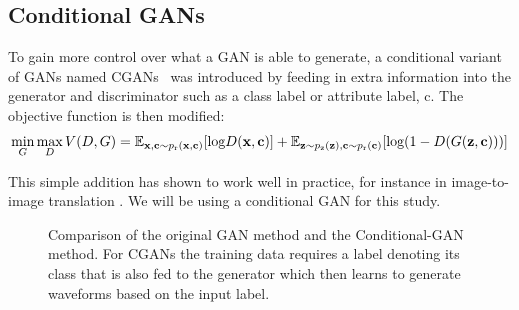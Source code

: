 \documentclass[12pt]{iopart}
\newcommand{\jordan}[1]{\textbf{\textcolor{red}{JORDAN: #1}}}
\newcommand{\chris}[1]{\textbf{\textcolor{green}{CHRIS: #1}}}
\begin{document}
\subsection{Conditional GANs}

%
To gain more control over what a GAN is able to generate, a conditional variant of \acp{GAN} named \acp{CGAN}~\cite{cgan} was introduced by feeding in extra information into the generator and discriminator such as a class label or attribute label, c. The objective function is then modified:
\begin{equation}
\mathop{\text{min}}_{G}  \mathop{\text{max}}_{D} V(D,G) = \mathbb{E}_{\mathbf{x,c} \sim p_{\text{r}}(\mathbf{x,c})} [\text{log} D(\mathbf{x,c})] \\ + \mathbb{E}_{\mathbf{z} \sim p_{\text{z}}(\mathbf{z}),\mathbf{c} \sim p_{\text{r}}(\mathbf{c})} [\text{log}(1-D(G(\mathbf{z,c})))]
\label{equation:cGANloss}
\end{equation}

This simple addition has shown to work well in practice, for instance in image-to-image translation \cite{isola2016imagetoimage}. We will be using a conditional GAN for this study.
%

%

\begin{figure}
    \centering
    \caption{Comparison of the original GAN method and the
Conditional-GAN method. For CGANs the training data requires a label denoting
its class that is also fed to the generator which then learns to generate
waveforms based on the input label.} \label{fig:gan_comparison}
\end{figure}
\end{document}
